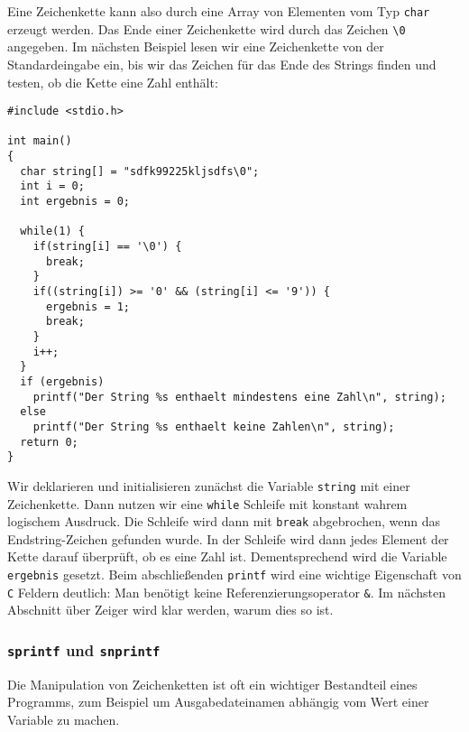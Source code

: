 Eine Zeichenkette kann also durch eine Array von Elementen vom Typ \verb|char| erzeugt werden.
Das Ende einer Zeichenkette wird durch das Zeichen \verb|\0| angegeben.
Im nächsten Beispiel lesen wir eine Zeichenkette von der Standardeingabe ein, bis wir das Zeichen für das Ende des Strings finden und testen, ob die Kette eine Zahl enthält:
\begin{lstlisting}
#include <stdio.h>

int main()
{
  char string[] = "sdfk99225kljsdfs\0";
  int i = 0;
  int ergebnis = 0;

  while(1) {
    if(string[i] == '\0') {
      break;
    }
    if((string[i]) >= '0' && (string[i] <= '9')) {
      ergebnis = 1;
      break;
    }
    i++;
  }
  if (ergebnis)
    printf("Der String %s enthaelt mindestens eine Zahl\n", string);
  else
    printf("Der String %s enthaelt keine Zahlen\n", string);
  return 0;
}
\end{lstlisting}
Wir deklarieren und initialisieren zunächst die Variable \texttt{string} mit einer Zeichenkette.
Dann nutzen wir eine \verb|while| Schleife mit konstant wahrem logischem Ausdruck.
Die Schleife wird dann mit \verb|break| abgebrochen, wenn das Endstring-Zeichen gefunden wurde.
In der Schleife wird dann jedes Element der Kette darauf überprüft, ob es eine Zahl ist.
Dementsprechend wird die Variable \verb|ergebnis| gesetzt.
Beim abschließenden \texttt{printf} wird eine wichtige Eigenschaft von \texttt{C} Feldern deutlich:
Man benötigt keine Referenzierungsoperator \verb|&|.\index{\&}
Im nächsten Abschnitt über Zeiger wird klar werden, warum dies so ist.

\subsubsection{\texttt{sprintf} und \texttt{snprintf}}

Die Manipulation von Zeichenketten ist oft ein wichtiger Bestandteil eines Programms, zum Beispiel um Ausgabedateinamen abhängig vom Wert einer Variable zu machen.

